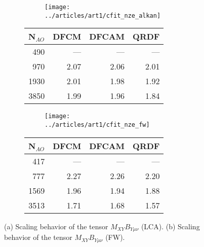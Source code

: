 %
\begin{figure}[htp]

\begin{subfigure}{\textwidth}
\begin{subfigure}{0.45\textwidth}
\texttt{[image: ../articles/art1/cfit\_nze\_alkan]}
\end{subfigure}
\hfill
\begin{subtable}{0.45\textwidth}
\begin{tabular}{rrrr}
\hline
N$_{AO}$ & DFCM & DFCAM & QRDF \\ \hline
490 & --- & --- & --- \\ 
970 & 2.07 & 2.06 & 2.01 \\ 
1930 & 2.01 & 1.98 & 1.92 \\ 
3850 & 1.99 & 1.96 & 1.84 \\ \hline
\end{tabular}
\end{subtable}
\caption{}
\label{fig:GS_MBNZE_LA}
\end{subfigure}

\vspace{1.5\baselineskip}

\begin{subfigure}{\textwidth}
\begin{subfigure}{0.45\textwidth}
\texttt{[image: ../articles/art1/cfit\_nze\_fw]}
\end{subfigure}
\hfill
\begin{subtable}{0.45\textwidth}
\begin{tabular}{rrrr}
\hline
N$_{AO}$ & DFCM & DFCAM & QRDF \\ \hline
417 & --- & --- & --- \\ 
777 & 2.27 & 2.26 & 2.20 \\ 
1569 & 1.96 & 1.94 & 1.88 \\ 
3513 & 1.71 & 1.68 & 1.57 \\ \hline
\end{tabular}
\end{subtable}
\caption{}
\label{fig:GS_MBNZE_FW}
\end{subfigure}
%

\caption[Scaling behavior of the tensor $M_{XY}B_{Y\mu\nu}$]{(a) Scaling behavior of the tensor $M_{XY}B_{Y\mu\nu}$ (LCA). (b) Scaling behavior of the tensor $M_{XY}B_{Y\mu\nu}$ (FW).}

\end{figure}